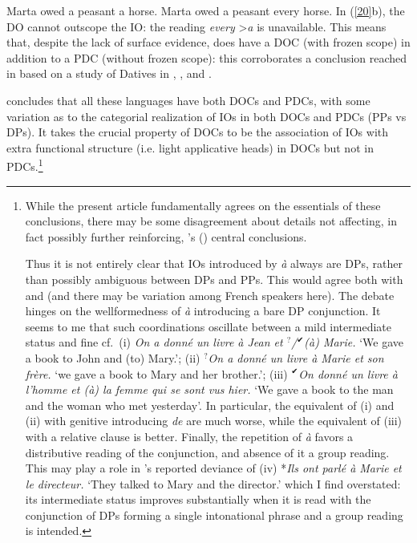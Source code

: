 \documentclass[output=paper]{langsci/langscibook}
\begin{document}
\ea \label{20}
    \ea Marta owed a peasant a horse.
    \ex Marta owed a peasant every horse.
    \z
\z
%
In (\ref{20}b), the DO cannot outscope the IO: the reading {\it every}
\textgreater {\it a} is unavailable. This means that, despite the lack of
surface evidence,   does have a \gls{DOC} (with frozen scope) in addition to a
    \gls{PDC} (without frozen scope):
    this corroborates a conclusion  reached in \citet{anagnostopoulou2005cross}
    based on a study of Datives in , , 
    and .

\citet{anagnostopoulou2005cross} concludes that all these  languages have both
\glspl{DOC} and \glspl{PDC}, with some variation as to the categorial
realization of \glspl{IO} in both \glspl{DOC} and \glspl{PDC} (PPs vs DPs).  It
takes the crucial  property of \glspl{DOC} to be  the association of \glspl{IO}
with extra functional structure (i.e. light applicative heads) in \glspl{DOC}
but not in \glspl{PDC}.{\footnote{While the present article fundamentally agrees
    on the essentials of these conclusions, there may be some disagreement
    about details not affecting, in fact possibly further reinforcing,
    \citeauthor{anagnostopoulou2005cross}'s
    (\citeyear{anagnostopoulou2005cross}) central conclusions.

    Thus it is not entirely clear that \glspl{IO} introduced by \emph{à} always
    are DPs, rather than possibly ambiguous between DPs and PPs. This would
    agree both with \citet{Kayne1975} and \citet{Vergnaud:1974} (and there may be
    variation among French speakers here). The debate hinges on the
    wellformedness of \emph{à} introducing a bare DP conjunction. It seems to
    me that such coordinations oscillate between a mild  intermediate status
    and fine cf.\ (i) \emph{On a donn\'e un livre \`a Jean et
        $^{?}$/$^{✔}$(\`a) Marie.} \enquote*{We gave a book to John and
        (to) Mary.}; (ii) \emph{$^{?}$On a donn\'e un livre \`a Marie et son
        fr\`ere.} \enquote*{we gave a book to Mary and her brother.}; (iii)
        $^{✔}$\emph{On donn\'e un livre \`a l'homme et (\`a) la femme qui
    se sont vus hier.} \enquote*{We gave a book to the man and the woman who met
    yesterday}. In particular, the equivalent of (i) and (ii) with
    genitive introducing {\it de} are much worse, while the
    equivalent of (iii) with a relative clause is better. Finally, the
    repetition of \emph{à} favors a distributive reading of the conjunction,
    and absence of it a group reading. This may play a role in
    \citeauthor{Jaeggli:1982}'s \citeyear{Jaeggli:1982} reported deviance of
    (iv) *\emph{Ils ont parl\'e \`a Marie et le directeur.} \enquote*{They talked to Mary
    and the director.} which I find overstated: its intermediate status
improves substantially when it is read with the conjunction of DPs forming a
single intonational phrase and a group reading is intended.}}
\end{document}
